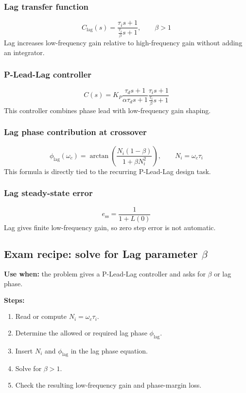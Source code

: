 \subsubsection{Lag transfer function}
\[
C_{\mathrm{lag}}(s)=\frac{\tau_i s+1}{\frac{\tau_i}{\beta}s+1},\qquad \beta>1
\]
Lag increases low-frequency gain relative to high-frequency gain without adding an integrator.

\subsubsection{P-Lead-Lag controller}
\[
C(s)=K_P
\frac{\tau_d s+1}{\alpha\tau_d s+1}
\frac{\tau_i s+1}{\frac{\tau_i}{\beta}s+1}
\]
This controller combines phase lead with low-frequency gain shaping.

\subsubsection{Lag phase contribution at crossover}
\[
\phi_{\mathrm{lag}}(\omega_c)=
\arctan\left(\frac{N_i(1-\beta)}{1+\beta N_i^2}\right),
\qquad N_i=\omega_c\tau_i
\]
This formula is directly tied to the recurring P-Lead-Lag design task.

\subsubsection{Lag steady-state error}
\[
e_{\mathrm{ss}}=\frac{1}{1+L(0)}
\]
Lag gives finite low-frequency gain, so zero step error is not automatic.

\subsection{Exam recipe: solve for Lag parameter \(\beta\)}

\textbf{Use when:} the problem gives a P-Lead-Lag controller and asks for \(\beta\) or lag phase.

\textbf{Steps:}
\begin{enumerate}
\item Read or compute \(N_i=\omega_c\tau_i\).
\item Determine the allowed or required lag phase \(\phi_{\mathrm{lag}}\).
\item Insert \(N_i\) and \(\phi_{\mathrm{lag}}\) in the lag phase equation.
\item Solve for \(\beta>1\).
\item Check the resulting low-frequency gain and phase-margin loss.
\end{enumerate}

